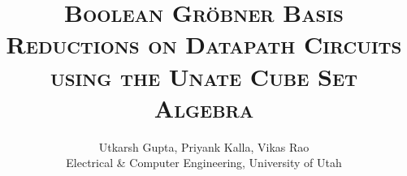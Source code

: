 \documentclass[10pt,twocolumn]{IEEEtran}
\newcommand{\ls}[1]
    {\dimen0=\fontdimen6\the\font
     \lineskip=#1\dimen0
     \advance\lineskip.5\fontdimen5\the\font
     \advance\lineskip-\dimen0
     \lineskiplimit=.9\lineskip
     \baselineskip=\lineskip
     \advance\baselineskip\dimen0
     \normallineskip\lineskip
     \normallineskiplimit\lineskiplimit
     \normalbaselineskip\baselineskip
     \ignorespaces
    }
\begin{document}



\title{\Large\textsc{Boolean Gr\"obner Basis Reductions on Datapath Circuits using the Unate Cube Set Algebra}}
\author{Utkarsh Gupta, Priyank Kalla, Vikas Rao \\
Electrical \& Computer Engineering, University of Utah \vspace{-0.2in}
}
 
 
\maketitle
\thispagestyle{empty}

\newcommand{\Fq}{{\mathbb{F}}_{q}}
\newcommand{\Fkk}{{\mathbb{F}}_{2^k}}
\newcommand{\Zkk}{{\mathbb{Z}}_{2^k}}
\newcommand{\Ftwo}{{\mathbb{F}}_{2}}
\newcommand{\Fkkx}[1][x]{\ensuremath{\mathbb{F}}_{2^k}[#1]\xspace}
\newcommand{\Grobner}{Gr\"{o}bner\xspace}
\newcommand{\B}{{\mathbb{B}}}
\newcommand{\Z}{{\mathbb{Z}}}
\newcommand{\F}{{\mathbb{F}}}
\newcommand{\G}{{\mathcal{G}}}
\newcommand{\alert}[1]{\textcolor{red}{#1}}

\newcommand{\spec}{{\it Spec}\xspace\ \xspace}

\newcommand{\debug}[1]{\textcolor{gray}{[ #1 ]}}









\end{document}
